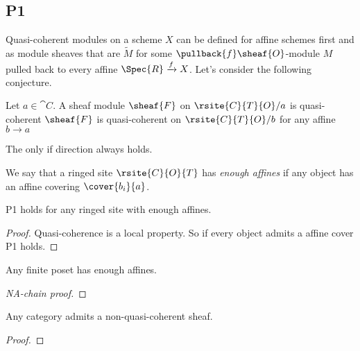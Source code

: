 \subsection{P1}

Quasi-coherent modules on a scheme $X$ can be defined for affine schemes first and  as module sheaves that are $\tilde{M}$ for some $\pullback{f}\sheaf{O}$-module $M$ pulled back to every affine $\Spec{R}\xrightarrow{f} X$. 
Let's consider the following conjecture. 

\begin{conjecture}[P1]
Let $a\in \cat{C}$.
A sheaf module $\sheaf{F}$ on $\rsite{C}{T}{O}/a$ is quasi-coherent \iff $\sheaf{F}$ is quasi-coherent on $\rsite{C}{T}{O}/b$ for any affine $b\rightarrow a$
\end{conjecture}

\begin{remark}
The only if direction always holds.
\end{remark}

\begin{definition}
We say that a ringed site $\rsite{C}{O}{T}$ has \emph{enough affines} if any object has an affine covering $\cover{b_i}{a}$.
\end{definition}

\begin{lemma}
P1 holds for any ringed site with enough affines.
\end{lemma}

\begin{proof}
Quasi-coherence is a local property. So if every object admits a affine cover P1 holds.
\end{proof}

\begin{lemma}
Any finite poset has enough affines.
\end{lemma}

\begin{proof}[NA-chain proof]

\end{proof}

\begin{lemma}
Any category admits a non-quasi-coherent sheaf.
\end{lemma}

\begin{proof}

\end{proof}


